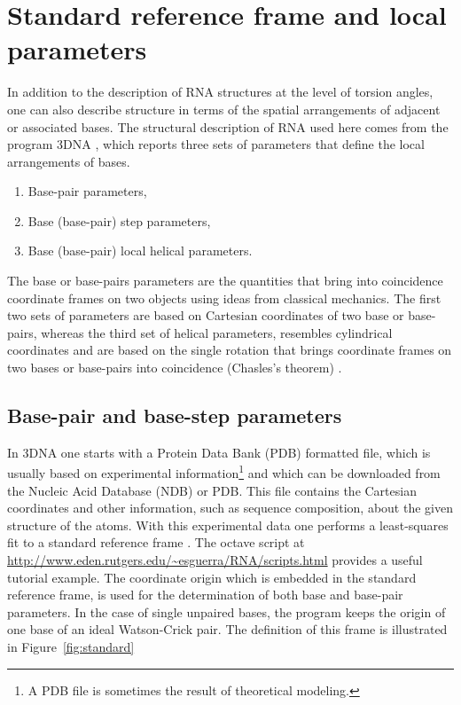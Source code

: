 \chapter{Standard reference frame and local parameters}
\label{appendix_1a}
  In   addition  to  the   description  of  RNA
structures  at the  level of  torsion  angles, one  can also  describe
structure  in  terms  of  the  spatial  arrangements  of  adjacent  or
associated bases.  The structural description  of RNA used  here comes
from the program \textsf{3DNA} \cite{lu2003}, which reports three sets
of parameters that define the local arrangements of bases.
\begin{enumerate}
\item Base-pair parameters,
\item Base (base-pair) step parameters,
\item Base (base-pair) local helical parameters.
\end{enumerate}
The base or  base-pairs parameters are the quantities  that bring into
coincidence  coordinate  frames  on   two  objects  using  ideas  from
classical mechanics.
The first two sets of parameters are based on Cartesian coordinates of
two base or  base-pairs, whereas the third set  of helical parameters,
resembles cylindrical coordinates and are based on the single rotation
that  brings  coordinate  frames  on  two  bases  or  base-pairs  into
coincidence (Chasles's theorem) \cite{babcock1994}.

\section{Base-pair and base-step parameters}
In \textsf{3DNA} one  starts with a Protein Data  Bank (PDB) formatted
\cite{berman2000}  file,  which   is  usually  based  on  experimental
information\footnote{A PDB file is sometimes the result of theoretical
  modeling.}   and  which can  be  downloaded  from  the Nucleic  Acid
Database (NDB)  or PDB.  This file contains  the Cartesian coordinates
and other  information, such as sequence composition,  about the given
structure of  the atoms.  With  this experimental data one  performs a
least-squares fit to a  standard reference frame \cite{olson2001}. The
\textsf{octave}                        script                       at
\url{http://www.eden.rutgers.edu/~esguerra/RNA/scripts.html}   provides
a useful tutorial example.  The coordinate origin which is embedded in
the standard  reference frame, is  used for the determination  of both
base and base-pair parameters.  In  the case of single unpaired bases,
the  program keeps the  origin of  one base  of an  ideal Watson-Crick
pair.    The   definition   of    this   frame   is   illustrated   in
Figure~\ref{fig:standard}

